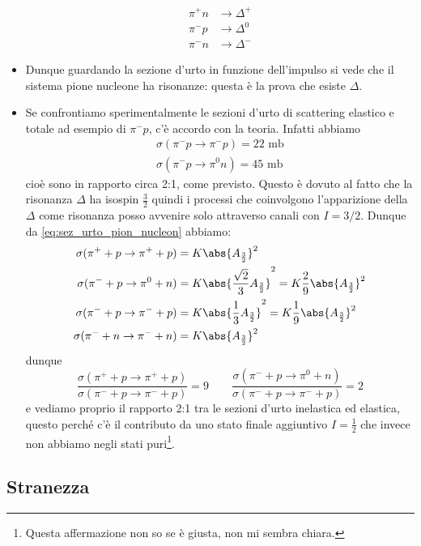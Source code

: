 \begin{itemize}
\begin{align*}
    \pi^+n&\to\Delta^+\\
    \pi^-p&\to\Delta^0\\
    \pi^-n&\to\Delta^-
\end{align*}
\item Dunque guardando la sezione d'urto in funzione dell'impulso si vede che il sistema pione nucleone ha risonanze: questa è la prova che esiste $\Delta$. 
\item Se confrontiamo sperimentalmente le sezioni d'urto di scattering elastico e totale ad esempio di $\pi^-p$, c'è accordo con la teoria. Infatti abbiamo
\begin{gather*}
    \sigma(\pi^-p\to\pi^-p)=22\text{ mb}\\
    \sigma(\pi^-p\to\pi^0n)=45\text{ mb}
\end{gather*}
cioè sono in rapporto circa 2:1, come previsto. Questo è dovuto al fatto che la risonanza $\Delta$ ha isospin $\frac32$ quindi i processi che coinvolgono l'apparizione della $\Delta$ come risonanza posso avvenire solo attraverso canali con $I=3/2$. Dunque da \eqref{eq:sez_urto_pion_nucleon} abbiamo:
    \begin{align*}
        \sigma(\pi^++p\to\pi^++p)&=K\abs{A_{\frac32}}^2\\
        \sigma(\pi^-+p\to\pi^0+n)&=K\abs{\frac{\sqrt2}3 A_{\frac32}}^2=K\frac29\abs{A_{\frac32}}^2\\
        \sigma(\pi^-+p\to\pi^-+p)&=K\abs{\frac13 A_{\frac32}}^2=K\frac19\abs{A_{\frac32}}^2\\
        \sigma(\pi^-+n\to\pi^-+n)&=K\abs{A_{\frac32}}^2
        \end{align*}
        dunque
        \begin{equation*}
            \frac{\sigma(\pi^++p\to\pi^++p)}{\sigma(\pi^-+p\to\pi^-+p)}=9\qquad\frac{\sigma(\pi^-+p\to\pi^0+n)}{\sigma(\pi^-+p\to\pi^-+p)}=2
        \end{equation*}
        e vediamo proprio il rapporto 2:1 tra le sezioni d'urto inelastica ed elastica, questo perché c'è il contributo da uno stato finale aggiuntivo $I=\frac12$ che invece non abbiamo negli stati puri\footnote{Questa affermazione non so se è giusta, non mi sembra chiara.}.
\end{itemize}
\subsection{Stranezza}
